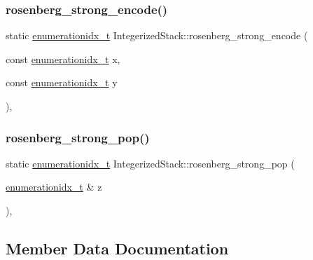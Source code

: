 \subsubsection{\texorpdfstring{rosenberg\+\_\+strong\+\_\+encode()}{rosenberg\_strong\_encode()}}
{\footnotesize\ttfamily static \hyperlink{_integerized_stack_8h_a9fe2bbca873b046b2bd276fc6856bb88}{enumerationidx\+\_\+t} Integerized\+Stack\+::rosenberg\+\_\+strong\+\_\+encode (\begin{DoxyParamCaption}\item[{const \hyperlink{_integerized_stack_8h_a9fe2bbca873b046b2bd276fc6856bb88}{enumerationidx\+\_\+t}}]{x,  }\item[{const \hyperlink{_integerized_stack_8h_a9fe2bbca873b046b2bd276fc6856bb88}{enumerationidx\+\_\+t}}]{y }\end{DoxyParamCaption})\hspace{0.3cm}{\ttfamily [inline]}, {\ttfamily [static]}}

\mbox{\label{class_integerized_stack_afd7b3e942bcde5b794ec06cbbb6593c7}} 
\subsubsection{\texorpdfstring{rosenberg\+\_\+strong\+\_\+pop()}{rosenberg\_strong\_pop()}}
{\footnotesize\ttfamily static \hyperlink{_integerized_stack_8h_a9fe2bbca873b046b2bd276fc6856bb88}{enumerationidx\+\_\+t} Integerized\+Stack\+::rosenberg\+\_\+strong\+\_\+pop (\begin{DoxyParamCaption}\item[{\hyperlink{_integerized_stack_8h_a9fe2bbca873b046b2bd276fc6856bb88}{enumerationidx\+\_\+t} \&}]{z }\end{DoxyParamCaption})\hspace{0.3cm}{\ttfamily [inline]}, {\ttfamily [static]}}



\subsection{Member Data Documentation}
\mbox{\label{class_integerized_stack_afcfb2d32d51c88b556f3bb7ff2544be5}} 
